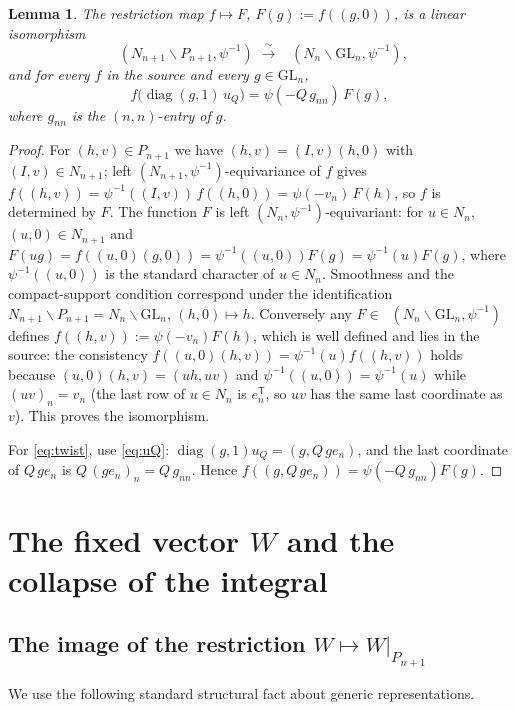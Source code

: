 \documentclass[12pt]{article}
\newcommand{\GL}{\mathrm{GL}}
\newcommand{\diag}{\operatorname{diag}}
\DeclareMathOperator{\Cc}{C_c^\infty}
\newtheorem{lemma}{Lemma}
\begin{document}
\begin{lemma}\label{lem:Cc-iso}
The restriction map $f\mapsto F$, $F(g):=f((g,0))$, is a linear isomorphism
\[
  \Cc(N_{n+1}\backslash P_{n+1},\psi^{-1})\;\xrightarrow{\ \sim\ }\;
  \Cc(N_n\backslash \GL_n,\psi^{-1}),
\]
and for every $f$ in the source and every $g\in\GL_n$,
\begin{equation}\label{eq:twist}
  f\bigl(\diag(g,1)\,u_Q\bigr)=\psi(-Q\,g_{nn})\,F(g),
\end{equation}
where $g_{nn}$ is the $(n,n)$-entry of $g$.
\end{lemma}

\begin{proof}
For $(h,v)\in P_{n+1}$ we have $(h,v)=(I,v)(h,0)$ with $(I,v)\in N_{n+1}$; left
$(N_{n+1},\psi^{-1})$-equivariance of $f$ gives
$f((h,v))=\psi^{-1}((I,v))\,f((h,0))=\psi(-v_n)\,F(h)$,
so $f$ is determined by $F$. The function $F$ is left
$(N_n,\psi^{-1})$-equivariant: for $u\in N_n$, $(u,0)\in N_{n+1}$ and
$F(ug)=f((u,0)(g,0))=\psi^{-1}((u,0))F(g)=\psi^{-1}(u)F(g)$, where
$\psi^{-1}((u,0))$ is the standard character of $u\in N_n$. Smoothness and the
compact-support condition correspond under the identification
$N_{n+1}\backslash P_{n+1}=N_n\backslash\GL_n$, $(h,0)\mapsto h$. Conversely any
$F\in\Cc(N_n\backslash\GL_n,\psi^{-1})$ defines $f((h,v)):=\psi(-v_n)F(h)$, which is
well defined and lies in the source: the consistency
$f((u,0)(h,v))=\psi^{-1}(u)f((h,v))$ holds because $(u,0)(h,v)=(uh,uv)$ and
$\psi^{-1}((u,0))=\psi^{-1}(u)$ while $(uv)_n=v_n$ (the last row of $u\in N_n$ is
$e_n^{\mathsf T}$, so $uv$ has the same last coordinate as $v$). This proves the
isomorphism.

For \eqref{eq:twist}, use \eqref{eq:uQ}: $\diag(g,1)u_Q=(g,Q\,ge_n)$, and the last
coordinate of $Q\,g e_n$ is $Q\,(g e_n)_n=Q\,g_{nn}$. Hence
$f((g,Q\,ge_n))=\psi(-Q\,g_{nn})F(g)$.
\end{proof}

\section{The fixed vector $W$ and the collapse of the integral}
\label{sec:chosenW}

\subsection{The image of the restriction $W\mapsto W|_{P_{n+1}}$}

We use the following standard structural fact about generic representations.
\end{document}
